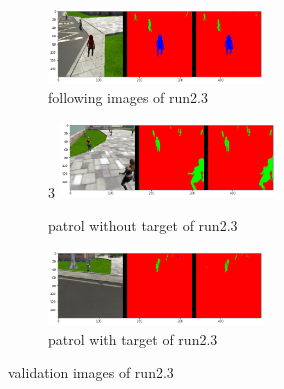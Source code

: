 \documentclass[paper=a4, fontsize=11pt]{scrartcl} %
\numberwithin{equation}{section} %
\numberwithin{figure}{section} %
\numberwithin{table}{section} %
\begin{document}
\begin{figure}[ht]
	\begin{subfigure}{0.33\textwidth}
	\includegraphics[width=0.9\linewidth, height=2cm]{./imgs/following_images23.png} 
	\caption{following images of run2.3}
	\label{fig:subfollowing_images23}
	\end{subfigure}
	\begin{subfigure}{0.33\textwidth}3
	\includegraphics[width=0.9\linewidth, height=2cm]{./imgs/patrol_non_targ23.png}
	\caption{patrol without target of run2.3}
	\label{fig:subpatrol_non_targ23}
	\end{subfigure}
	\begin{subfigure}{0.33\textwidth}
	\includegraphics[width=0.9\linewidth, height=2cm]{./imgs/patrol_with_targ23.png}
	\caption{patrol with target of run2.3}
	\label{fig:subpatrol_with_targ23}
	\end{subfigure}

	\caption{validation images of run2.3}
	\label{fig:outputimages23}
\end{figure}
\end{document}
